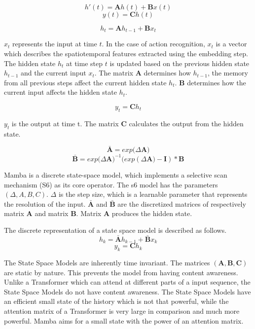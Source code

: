 \[h'(t) = \textbf{A}h(t)+\textbf{B}x(t)\]
\[y(t) = \textbf{C}h(t)\]


\[h_t = \textbf{A}h_{t-1}+\textbf{B}x_t\]

\(x_t\) represents the input at time \(t\). In the case of action recognition, $x_t$ is a vector which describes the spatiotemporal features extracted using the %
embedding step. The hidden state \(h_t\) at time step \(t\) is updated based on the previous hidden state \(h_{t-1}\) and the current input \(x_t\). The matrix \(\textbf{A}\) determines how \(h_{t-1}\), the memory from all previous steps affect the current hidden state \(h_t\). \(\textbf{B}\) determines how the current input affects the hidden state \(h_t\).

\[y_t = \textbf{C}h_t\]

$y_t$ is the output at time t. The matrix \(\textbf{C}\) calculates the output from the hidden state. 

\[\bar{\textbf{A}} = exp(\Delta\textbf{A)} \]
\[\bar{\textbf{B}} = exp(\Delta\textbf{A)}^{-1}(exp(\Delta\textbf{A)} - \mathbf{I}) * \textbf{B} \]

Mamba is a discrete state-space model, which implements a selective scan mechanism (S6) as its core operator. The \acrshort{s6} model has the parameters $(\Delta, {A, B, C})$. 
\(\Delta\) is the step size,  which is a learnable parameter that represents the resolution of the input. \(\bar{\textbf{A}}\) and \(\bar{\textbf{B}}\) are the discretized matrices of respectively matrix \(\textbf{A}\) and matrix \(\textbf{B}\). Matrix \textbf{A} produces the hidden state. 

The discrete representation of a state space model is described as follows. 
\[h_k = \bar{\textbf{A}}h_{k-1} + \bar{\textbf{B}}x_k\]
\[y_k = \textbf{C}h_k\]

The State Space Models are inherently time invariant. The matrices $(\textbf{A}, \textbf{B}, \textbf{C})$ are static by nature. This prevents the model from having content awareness. Unlike a Transformer which can attend at different parts of a input sequence, the State Space Models do not have content awareness. The State Space Models have an efficient small state of the history which is not that powerful, while the attention matrix of a Transformer is very large in comparison and much more powerful. Mamba aims for a small state with the power of an attention matrix. 


